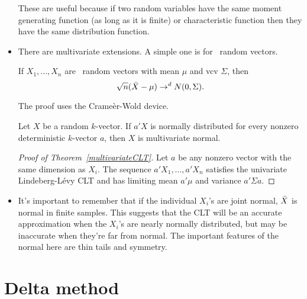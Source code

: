 \begin{itemize}[leftmargin=0pt]
  These are useful because if two random variables have the same
  moment generating function (as long as it is finite) or
  characteristic function then they have the same distribution
  function.

\item There are multivariate extensions.  A simple one is for \iid\
  random vectors.
  \begin{thm}\label{multivariateCLT}
    If $X_1,...,X_n$ are \iid\ random vectors with mean $\mu$ and vcv $\Sigma$,
    then
    \begin{equation*}
      \sqrt{n}(\bar{X} - \mu) \to^d N(0,\Sigma).
    \end{equation*}
  \end{thm}

  The proof uses the Crame\`er-Wold device.
  \begin{thm}
    Let $X$ be a random $k$-vector.  If $a'X$ is normally distributed
    for every nonzero deterministic $k$-vector $a$, then $X$ is
    multivariate normal.
  \end{thm}

  \begin{proof}[Proof of Theorem~\ref{multivariateCLT}]
    Let $a$ be any nonzero vector with the same dimension as $X_i$.
    The sequence $a'X_1,...,a'X_n$ satisfies the univariate
    Lindeberg-L\'evy CLT and has limiting mean $a'\mu$ and variance
    $a'\Sigma a$.
\end{proof}

\item It's important to remember that if the individual $X_i$'s are
  joint normal, $\bar{X}$ is normal in finite samples.  This suggests that
  the CLT will be an accurate approximation when the $X_i$'s are
  nearly normally distributed, but may be inaccurate when they're far
  from normal.  The important features of the normal here are thin
  tails and symmetry.

\end{itemize}

\section{Delta method}

